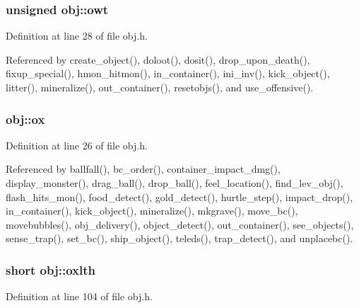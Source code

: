 \hypertarget{structobj_a606b1d5b273b814049cc1b1991adfeec}{
\subsubsection[{owt}]{\setlength{\rightskip}{0pt plus 5cm}unsigned obj\+::owt}}\label{structobj_a606b1d5b273b814049cc1b1991adfeec}


Definition at line 28 of file obj.\+h.



Referenced by create\+\_\+object(), doloot(), dosit(), drop\+\_\+upon\+\_\+death(), fixup\+\_\+special(), hmon\+\_\+hitmon(), in\+\_\+container(), ini\+\_\+inv(), kick\+\_\+object(), litter(), mineralize(), out\+\_\+container(), resetobjs(), and use\+\_\+offensive().

\hypertarget{structobj_aac936c7da6b4f1eca0a94f75c242e5cc}{
\subsubsection[{ox}]{ obj\+::ox}}\label{structobj_aac936c7da6b4f1eca0a94f75c242e5cc}


Definition at line 26 of file obj.\+h.



Referenced by ballfall(), bc\+\_\+order(), container\+\_\+impact\+\_\+dmg(), display\+\_\+monster(), drag\+\_\+ball(), drop\+\_\+ball(), feel\+\_\+location(), find\+\_\+lev\+\_\+obj(), flash\+\_\+hits\+\_\+mon(), food\+\_\+detect(), gold\+\_\+detect(), hurtle\+\_\+step(), impact\+\_\+drop(), in\+\_\+container(), kick\+\_\+object(), mineralize(), mkgrave(), move\+\_\+bc(), movebubbles(), obj\+\_\+delivery(), object\+\_\+detect(), out\+\_\+container(), see\+\_\+objects(), sense\+\_\+trap(), set\+\_\+bc(), ship\+\_\+object(), teleds(), trap\+\_\+detect(), and unplacebc().

\hypertarget{structobj_aff8be0ef151aed04ef0d41f39c90b9ef}{
\subsubsection[{oxlth}]{\setlength{\rightskip}{0pt plus 5cm}short obj\+::oxlth}}\label{structobj_aff8be0ef151aed04ef0d41f39c90b9ef}


Definition at line 104 of file obj.\+h.



